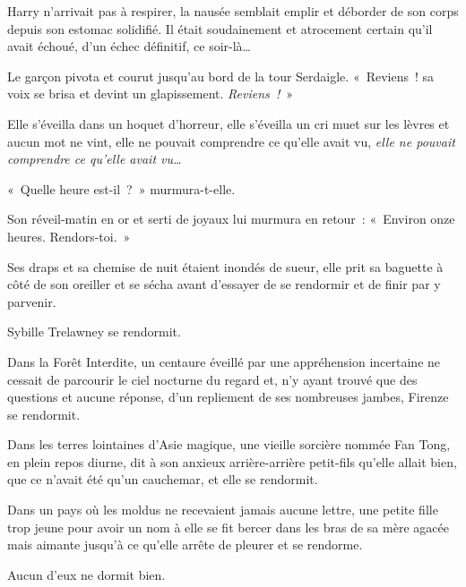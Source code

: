 Harry n'arrivait pas à respirer, la nausée semblait emplir et déborder de son corps depuis son estomac solidifié. Il était soudainement et atrocement certain qu'il avait échoué, d'un échec définitif, ce soir-là…

Le garçon pivota et courut jusqu'au bord de la tour Serdaigle. «~Reviens~! sa voix se brisa et devint un glapissement. \emph{Reviens~!}~»


Elle s'éveilla dans un hoquet d'horreur, elle s'éveilla un cri muet sur les lèvres et aucun mot ne vint, elle ne pouvait comprendre ce qu'elle avait vu, \emph{elle ne pouvait comprendre ce qu'elle avait vu…}

«~Quelle heure est-il~?~» murmura-t-elle.

Son réveil-matin en or et serti de joyaux lui murmura en retour~: «~Environ onze heures. Rendors-toi.~»

Ses draps et sa chemise de nuit étaient inondés de sueur, elle prit sa baguette à côté de son oreiller et se sécha avant d'essayer de se rendormir et de finir par y parvenir.

Sybille Trelawney se rendormit.

Dans la Forêt Interdite, un centaure éveillé par une appréhension incertaine ne cessait de parcourir le ciel nocturne du regard et, n'y ayant trouvé que des questions et aucune réponse, d'un repliement de ses nombreuses jambes, Firenze se rendormit.

Dans les terres lointaines d'Asie magique, une vieille sorcière nommée Fan Tong, en plein repos diurne, dit à son anxieux arrière-arrière petit-fils qu'elle allait bien, que ce n'avait été qu'un cauchemar, et elle se rendormit.

Dans un pays où les moldus ne recevaient jamais aucune lettre, une petite fille trop jeune pour avoir un nom à elle se fit bercer dans les bras de sa mère agacée mais aimante jusqu'à ce qu'elle arrête de pleurer et se rendorme.

Aucun d'eux ne dormit bien.

